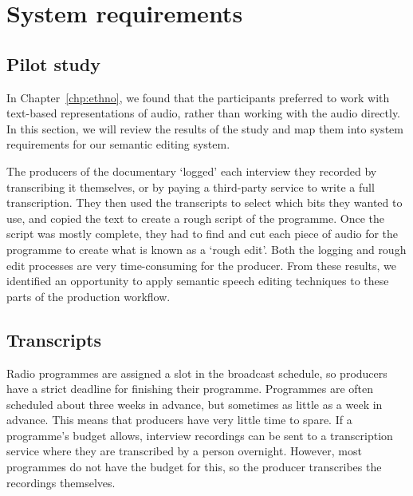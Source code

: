 

\section{System requirements}\label{sec:requirements}

\subsection{Pilot study}

In Chapter~\ref{chp:ethno}, we found that the participants preferred to work with text-based representations of audio,
rather than working with the audio directly.  In this section, we will review the results of the study and map them
into system requirements for our semantic editing system.

The producers of the documentary `logged' each interview they recorded by transcribing it themselves, or by paying a
third-party service to write a full transcription.  They then used the transcripts to select which bits they wanted to
use, and copied the text to create a rough script of the programme. Once the script was mostly complete, they had to
find and cut each piece of audio for the programme to create what is known as a `rough edit'.  Both the logging and
rough edit processes are very time-consuming for the producer.  From these results, we identified an opportunity to
apply semantic speech editing techniques to these parts of the production workflow.

\subsection{Transcripts}
Radio programmes are assigned a slot in the broadcast schedule, so producers have a strict deadline for finishing their
programme. Programmes are often scheduled about three weeks in advance, but sometimes as little as a week in advance.
This means that producers have very little time to spare. If a programme's budget allows, interview recordings can be
sent to a transcription service where they are transcribed by a person overnight. However, most programmes do not have
the budget for this, so the producer transcribes the recordings themselves.

